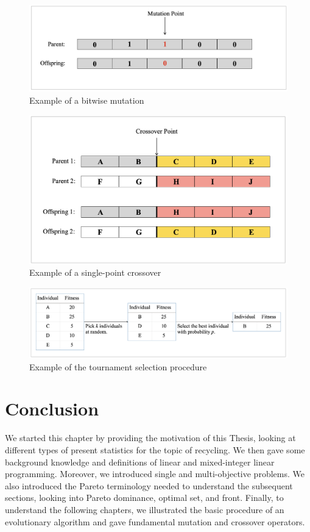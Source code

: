 \documentclass[mscthesis, 11pt]{usiinfthesis}
\theoremstyle{newdefinition}
\begin{document}
\begin{figure}[ht]
    \centering
    \includegraphics[width=\textwidth]{literature_review/bitwise_mutation_example.png}
    \caption{Example of a bitwise mutation}
    \label{fig:bitwise_mutation}
\end{figure}
\begin{figure}[ht]
    \centering
    \includegraphics[width=\textwidth]{literature_review/single_point_crossover_example.png}
    \caption{Example of a single-point crossover}
    \label{fig:single_point_crossover}
\end{figure}
\begin{figure}[ht]
    \centering
    \includegraphics[width=\textwidth]{literature_review/tournament_selection_example.png}
    \caption{Example of the tournament selection procedure}
    \label{fig:tournament_selection}
\end{figure}
\clearpage
\section{Conclusion}
We started this chapter by providing the motivation of this Thesis, looking at different types of present statistics for the topic of recycling. We then gave some background knowledge and definitions of linear and mixed-integer linear programming. Moreover, we introduced single and multi-objective problems. We also introduced the Pareto terminology needed to understand the subsequent sections, looking into Pareto dominance, optimal set, and front. Finally, to understand the following chapters, we illustrated the basic procedure of an evolutionary algorithm and gave fundamental mutation and crossover operators.
\end{document}
